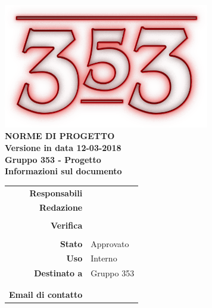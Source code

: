 \documentclass[openany, a4paper, 12pt]{report}
\begin{document}
\begin{titlepage}
	\centering
	\vfill
	{
		\bfseries
		\vskip2cm
		\includegraphics[width=9cm]{../../common/images/logo.png} \\
		\vfill
		\Huge{NORME DI PROGETTO}\\
		\vfill
		\Large Versione \vrdue in data 12-03-2018\\ %
		\large Gruppo 353 - Progetto \progetto \\
		\vfill
		\normalsize Informazioni sul documento\\
		\begin{table}[htbp]
			\centering
			\renewcommand\arraystretch{1.2}
			\begin{tabular}{r|l}
				\hline
				\textbf{Responsabili}	& \Riccardo \\
								
														
				\textbf{Redazione} 		& \Gianluca \\
										& \Valentina \\
										
				\textbf{Verifica} 		& \Davide \\
										& \Mirco \\	
				
				\textbf{Stato} 			& Approvato \\
				\textbf{Uso}			& Interno \\
				\textbf{Destinato a}   	& Gruppo 353 \\
										& \Vardanega \\
										& \Cardin \\
				
				\textbf{Email di contatto}	& \mailgroup
			\end{tabular}
		\end{table}
		\vfill
	}    
\end{titlepage}

\tableofcontents
\newpage
{}




\appendix



 
\end{document}
